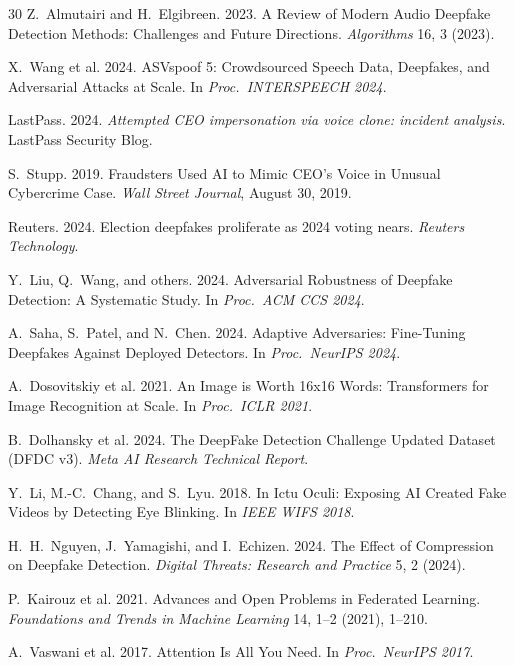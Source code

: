 \documentclass[sigconf,nonacm]{acmart}
\begin{document}
\begin{thebibliography}{30}
Z.~Almutairi and H.~Elgibreen. 2023. A Review of Modern Audio
Deepfake Detection Methods: Challenges and Future Directions.
\textit{Algorithms} 16, 3 (2023).

X.~Wang et al. 2024. ASVspoof 5: Crowdsourced Speech Data, Deepfakes,
and Adversarial Attacks at Scale. In \textit{Proc.\ INTERSPEECH 2024}.

LastPass. 2024. \textit{Attempted CEO impersonation via voice clone:
incident analysis}. LastPass Security Blog.

S.~Stupp. 2019. Fraudsters Used AI to Mimic CEO's Voice in Unusual
Cybercrime Case. \textit{Wall Street Journal}, August 30, 2019.

Reuters. 2024. Election deepfakes proliferate as 2024 voting nears.
\textit{Reuters Technology}.

Y.~Liu, Q.~Wang, and others. 2024. Adversarial Robustness of Deepfake
Detection: A Systematic Study. In \textit{Proc.\ ACM CCS 2024}.

A.~Saha, S.~Patel, and N.~Chen. 2024. Adaptive Adversaries: Fine-Tuning
Deepfakes Against Deployed Detectors. In \textit{Proc.\ NeurIPS 2024}.

A.~Dosovitskiy et al. 2021. An Image is Worth 16x16 Words: Transformers
for Image Recognition at Scale. In \textit{Proc.\ ICLR 2021}.

B.~Dolhansky et al. 2024. The DeepFake Detection Challenge Updated
Dataset (DFDC v3). \textit{Meta AI Research Technical Report}.

Y.~Li, M.-C.~Chang, and S.~Lyu. 2018. In Ictu Oculi: Exposing AI
Created Fake Videos by Detecting Eye Blinking. In \textit{IEEE WIFS 2018}.

H.~H.~Nguyen, J.~Yamagishi, and I.~Echizen. 2024. The Effect of
Compression on Deepfake Detection. \textit{Digital Threats: Research
and Practice} 5, 2 (2024).

P.~Kairouz et al. 2021. Advances and Open Problems in Federated
Learning. \textit{Foundations and Trends in Machine Learning} 14, 1--2
(2021), 1--210.

A.~Vaswani et al. 2017. Attention Is All You Need.
In \textit{Proc.\ NeurIPS 2017}.


\end{thebibliography}
\end{document}
